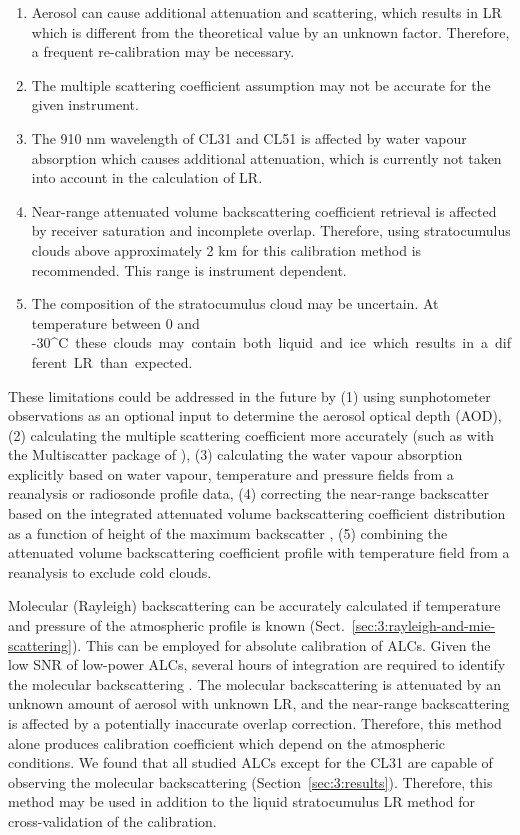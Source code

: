 \begin{enumerate}
\item Aerosol can cause additional attenuation and
scattering, which results in LR which is different from the theoretical
value by an unknown factor. Therefore, a frequent re-calibration may be
necessary.
\item The multiple scattering coefficient assumption may not be accurate for the given
instrument.
\item The 910 nm wavelength of CL31 and CL51 is affected by water vapour
absorption which causes additional attenuation, which is currently not taken
into account in the calculation of LR.
\item Near-range attenuated volume backscattering coefficient retrieval is affected by receiver saturation
and incomplete overlap. Therefore, using stratocumulus clouds above
approximately 2 km for this calibration method is recommended. This range
is instrument dependent.
\item The composition of the stratocumulus cloud may be uncertain.
At temperature between 0 and -30\unit{^\circ C} these clouds may contain both liquid and ice
which results in a different LR than expected.
\end{enumerate}

These limitations could be addressed in the future by (1) using sunphotometer
observations as an optional input to determine the aerosol optical depth (AOD),
(2) calculating the multiple
scattering coefficient more accurately (such as with the Multiscatter package of
\cite{hogan2006}), (3) calculating the water vapour absorption explicitly based
on water vapour, temperature and pressure fields from a reanalysis or
radiosonde profile data, (4) correcting the near-range backscatter based on
the integrated attenuated volume backscattering coefficient distribution as a function of height of the maximum backscatter \citep[Sect. 5.1]{hopkin2019}, (5)
combining the attenuated volume backscattering coefficient profile with temperature field from a reanalysis
to exclude cold clouds.

Molecular (Rayleigh) backscattering can be accurately calculated if temperature
and pressure of the atmospheric profile is known (Sect.~\ref{sec:3:rayleigh-and-mie-scattering}). This can be employed for absolute
calibration of ALCs. Given the low SNR of low-power ALCs,
several hours of integration are required to identify the molecular
backscattering \citep{wiegner2014}. The molecular backscattering is attenuated by an unknown
amount of aerosol with unknown LR, and the near-range backscattering
is affected by a potentially inaccurate overlap correction. Therefore, this
method alone produces calibration coefficient which depend on the atmospheric
conditions. We found that all studied ALCs except for the CL31 are capable
of observing the molecular backscattering (Section~\ref{sec:3:results}).
Therefore, this method may be used in addition to the liquid stratocumulus
LR method for cross-validation of the calibration.


